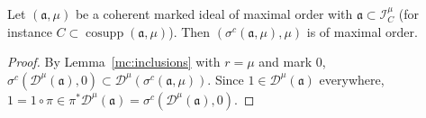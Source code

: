 \begin{lemma}
\label{mc:maximal-order-transform}
\mixedleanok
Let \((\mathfrak a,\mu)\) be a coherent marked ideal of maximal order with \(\mathfrak a\subset\mathcal I_C^\mu\) (for instance
\(C\subset\operatorname{cosupp}(\mathfrak a,\mu)\)). Then \((\sigma^c(\mathfrak a,\mu),\mu)\) is of maximal order.
\end{lemma}
\begin{proof}
\mixedleanok
By Lemma~\ref{mc:inclusions} with \(r=\mu\) and mark \(0\), \(\sigma^c(\mathcal D^\mu(\mathfrak a),0)\subset\mathcal D^\mu(\sigma^c(\mathfrak a,\mu))\). Since
\(1\in\mathcal D^\mu(\mathfrak a)\) everywhere, \(1=1\circ\pi\in\pi^*\mathcal D^\mu(\mathfrak a)=\sigma^c(\mathcal D^\mu(\mathfrak a),0)\).
\end{proof}
